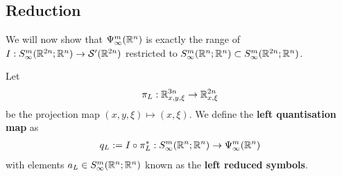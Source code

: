 \documentclass[12pt]{article}
\begin{document}
\subsection{Reduction}
We will now show that $\Psi^{m}_\infty({\mathbb R}^n)$ is exactly the range of $I : S^{m}_\infty({\mathbb R}^{2n}; {\mathbb R}^n) \to \mathcal{S}'({\mathbb R}^{2n})$ restricted to $S^{m}_\infty({\mathbb R}^{n}; {\mathbb R}^n) \subset S^{m}_\infty({\mathbb R}^{2n}; {\mathbb R}^n)$. 
\begin{fdefinition}
    Let 
    \begin{align*}
        \pi_L : {\mathbb R}^{3n}_{x, y, \xi} \to {\ensuremath {\mathbb R}}^{2n}_{x, \xi}
    \end{align*}
    be the projection map $(x, y, \xi) \mapsto (x, \xi)$. We define the \textbf{left quantisation map} as 
    \begin{align*}
        q_L := I \circ \pi_L^* : S^{m}_\infty({\mathbb R}^{n}; {\mathbb R}^n) \to \Psi^{m}_\infty({\mathbb R}^{n}) 
    \end{align*}
    with elements $a_L \in S^{m}_\infty({\mathbb R}^{n}; {\mathbb R}^n)$ known as the \textbf{left reduced symbols}.
    
\end{fdefinition}
\end{document}
